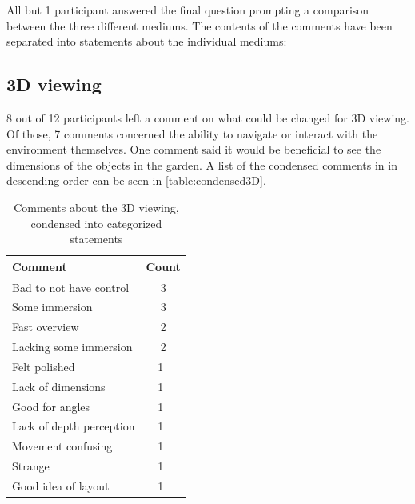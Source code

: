 All but 1 participant answered the final question prompting a comparison between the three different mediums. 
The contents of the comments have been separated into statements about the individual mediums:
\subsection*{3D viewing}
	8 out of 12 participants left a comment on what could be changed for 3D viewing. Of those, 7 comments concerned the ability to navigate or interact with the environment themselves. One comment said it would be beneficial to see the dimensions of the objects in the garden. A list of the condensed comments in in descending order can be seen in \autoref{table:condensed3D}.
		\begin{table}[H]
		\centering
		\caption{Comments about the 3D viewing, condensed into categorized statements}
		\label{table:condensed3D}
		\begin{tabular}{p{5cm}|c}
			Comment & Count \\ \hline
			Bad to not have control & 3 \\
			Some immersion & 3 \\
			Fast overview &2 \\
			Lacking some immersion &2 \\
			Felt polished& 1 \\
			Lack of dimensions& 1 \\
			Good for angles& 1 \\
			Lack of depth perception& 1 \\
			Movement confusing& 1 \\
			Strange& 1 \\
			Good idea of layout& 1 \\
		\end{tabular}
	\end{table}
